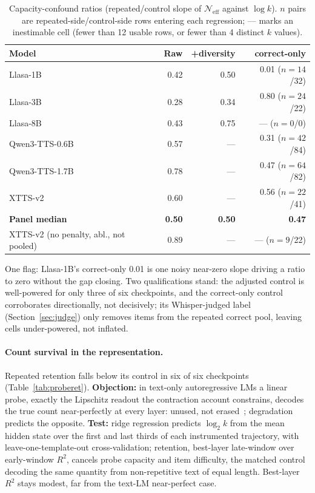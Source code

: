\begin{table}[tp]
\centering
\caption{Capacity-confound ratios (repeated/control slope of $\mathcal{N}_{\mathrm{eff}}$ against
$\log k$). $n$ pairs are repeated-side/control-side rows entering each regression; --- marks an
inestimable cell (fewer than 12 usable rows, or fewer than 4 distinct $k$ values).}
\label{tab:capconf}
\small
\begin{tabular}{@{}lrrr@{}}
\toprule
Model & Raw & +diversity & correct-only \\
\midrule
Llasa-1B & 0.42 & 0.50 & 0.01 ($n{=}14$/32) \\
Llasa-3B & 0.28 & 0.34 & 0.80 ($n{=}24$/22) \\
Llasa-8B & 0.43 & 0.75 & --- ($n{=}0$/0) \\
Qwen3-TTS-0.6B & 0.57 & --- & 0.31 ($n{=}42$/84) \\
Qwen3-TTS-1.7B & 0.78 & --- & 0.47 ($n{=}64$/82) \\
XTTS-v2 & 0.60 & --- & 0.56 ($n{=}22$/41) \\
\midrule
\textbf{Panel median} & \textbf{0.50} & \textbf{0.50} & \textbf{0.47} \\
XTTS-v2 (no penalty, abl., not pooled) & 0.89 & --- & --- ($n{=}9$/22) \\
\bottomrule
\end{tabular}
\end{table}

One flag: Llasa-1B's correct-only 0.01 is one noisy near-zero slope driving a ratio to zero
without the gap closing. Two qualifications stand: the adjusted control is well-powered for
only three of six checkpoints, and the correct-only control corroborates directionally, not
decisively; its Whisper-judged label (Section~\ref{sec:judge}) only removes items from the
repeated correct pool, leaving cells under-powered, not inflated.

\paragraph{Count survival in the representation.} Repeated retention falls below its control in
six of six checkpoints (Table~\ref{tab:proberet}). \textbf{Objection:} in text-only autoregressive
LMs a linear probe, exactly the Lipschitz readout the contraction account constrains, decodes
the true count near-perfectly at every layer: unused, not
erased~\cite{venkatesh2026repeated}; degradation predicts the opposite. \textbf{Test:} ridge
regression predicts $\log_2 k$ from the mean hidden state over the first and last thirds of
each instrumented trajectory, with leave-one-template-out cross-validation; retention,
best-layer late-window over early-window $R^2$, cancels probe capacity and item difficulty,
the matched control decoding the same quantity from non-repetitive text of equal length.
Best-layer $R^2$ stays modest, far from the text-LM near-perfect case.

